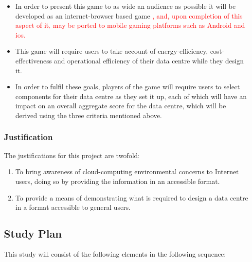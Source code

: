 \begin{itemize}

\item In order to present this game to as wide an audience as possible it will be developed as an internet-browser based game \textcolor{red}{, and, upon completion of this aspect of it, may be ported to mobile gaming platforms such as Android and ios.}

\item This game will require users to take account of energy-efficiency, cost-effectiveness and operational efficiency of their data centre while they design it.

\item In order to fulfil these goals, players of the game will require users to select components for their \gls{data centre} as they set it up, each of which will have an impact on an overall aggregate score for the \gls{data centre}, which will be derived using the three criteria mentioned above.

\end{itemize}

\subsubsection{Justification}
\label{sec:ProjectGoal:Justification}
The justifications for this project are twofold:

\begin{enumerate}
\item To bring awareness of cloud-computing environmental concerns to Internet users, doing so by providing the information in an accessible format.

\item To provide a means of demonstrating what is required to design a data centre in a format accessible to general users.
\end{enumerate}

\subsection{Study Plan}
\label{sec:Background:StudyPlan}
This study will consist of the following elements in the following sequence:

